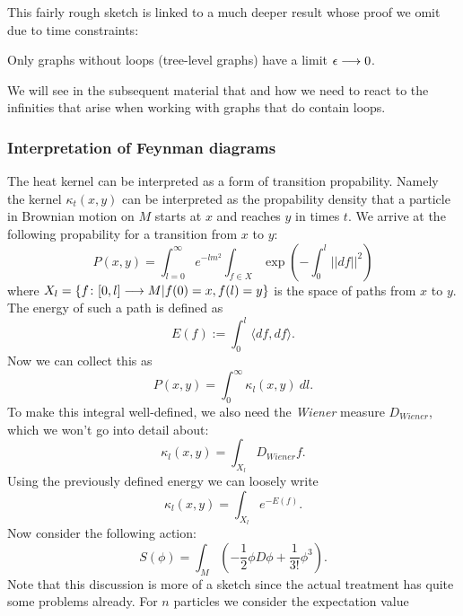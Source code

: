 This fairly rough sketch is linked to a much deeper result whose proof we omit due to time constraints:

\begin{fact}
  Only graphs without loops (tree-level graphs) have a limit $\epsilon \lra 0$.
\end{fact}

We will see in the subsequent material that and how we need to react to the infinities that arise when working with graphs that do contain loops.


\subsubsection{Interpretation of Feynman diagrams}
\label{subsubsec:feynman_intepretation}

The heat kernel can be interpreted as a form of transition propability. Namely the kernel $\kappa_t(x,y)$ can be interpreted as the propability density that a particle in Brownian motion on $M$ starts at $x$ and reaches $y$ in times $t$. We arrive at the following propability for a transition from $x$ to $y$:
\begin{equation} P(x,y) = \int_{l=0}^\infty e^{-lm^2} \int_{f\in X}  \exp\left( - \int_0^l ||df||^2 \right)\end{equation}
where $X_l = \{f \colon [0,l] \longrightarrow M | f(0) = x, f(l) = y \}$ is the space of paths from $x$ to $y$. The energy of such a path is defined as
\begin{equation}
  E(f) := \int_0^l \langle df, df \rangle.
\end{equation}
Now we can collect this as
\begin{equation}
  P(x,y) = \int_0^\infty \kappa_l(x,y) \ dl.
\end{equation}
To make this integral well-defined, we also need the \emph{Wiener} measure $D_{Wiener}$, which we won't go into detail about:
\begin{equation}
  \kappa_l (x,y) = \int_{X_l} D_{Wiener} f.
\end{equation}
Using the previously defined energy we can loosely write
\begin{equation}
  \kappa_l (x,y) = \int_{X_l} e^{- E(f)}.
\end{equation}
Now consider the following action:
\begin{equation}
  S(\phi) = \int_M \left( - \frac{1}{2} \phi D\phi + \frac{1}{3!} \phi^3 \right).
\end{equation}
Note that this discussion is more of a sketch since the actual treatment has quite some problems already. For $n$ particles we consider the expectation value

